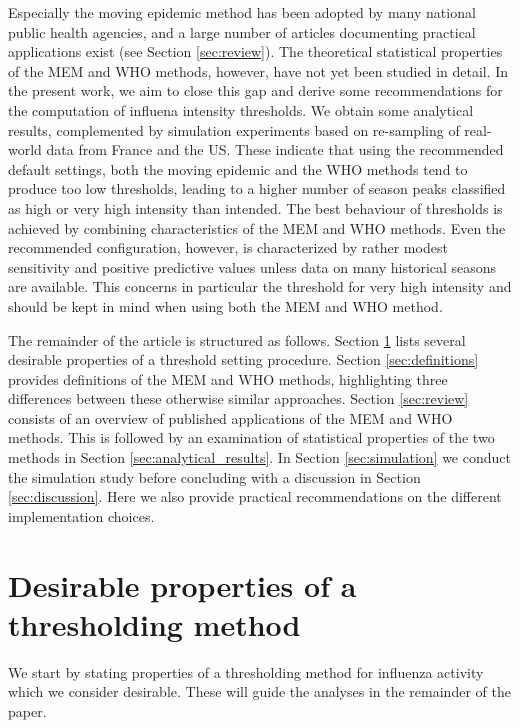 \documentclass{article}
\begin{document}
Especially the moving epidemic method has been adopted by many national public health agencies, and a large number of articles documenting practical applications exist (see Section \ref{sec:review}). The theoretical statistical properties of the MEM and WHO methods, however, have not yet been studied in detail. In the present work, we aim to close this gap and derive some recommendations for the computation of influena intensity thresholds. We obtain some analytical results, complemented by simulation experiments based on re-sampling of real-world data from France and the US. These indicate that using the recommended default settings, both the moving epidemic and the WHO methods tend to produce too low thresholds, leading to a higher number of season peaks classified as high or very high intensity than intended. The best behaviour of thresholds is achieved by combining characteristics of the MEM and WHO methods. Even the recommended configuration, however, is characterized by rather modest sensitivity and positive predictive values unless data on many historical seasons are available. This concerns in particular the threshold for very high intensity and should be kept in mind when using both the MEM and WHO method.

The remainder of the article is structured as follows. Section \ref{sec:desirable_properties} lists several desirable properties of a threshold setting procedure. Section \ref{sec:definitions} provides definitions of the MEM and WHO methods, highlighting three differences between these otherwise similar approaches. Section \ref{sec:review} consists of an overview of published applications of the MEM and WHO methods. This is followed by an examination of statistical properties of the two methods in Section \ref{sec:analytical_results}. In Section \ref{sec:simulation} we conduct the simulation study before concluding with a discussion in Section \ref{sec:discussion}. Here we also provide practical recommendations on the different implementation choices.


\section{Desirable properties of a thresholding method}
\label{sec:desirable_properties}

We start by stating properties of a thresholding method for influenza activity which we consider desirable. These will guide the analyses in the remainder of the paper.
\end{document}
